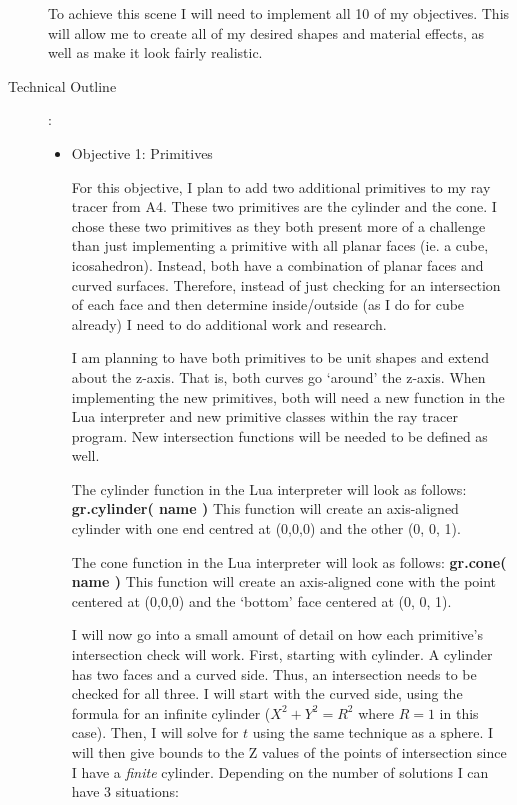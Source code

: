 \documentclass {article}
\begin{document}
\begin{description}
	To achieve this scene I will need to implement all 10 of my objectives. This will allow me to create all of my desired shapes and material effects, as well as make it look fairly realistic. \newline
	
	

\item[Technical Outline]:\\

    \begin{itemize}
    	\item Objective 1: Primitives\newline
    	
    	For this objective, I plan to add two additional primitives to my ray tracer from A4. These two primitives are the cylinder and the cone. I chose these two primitives as they both present more of a challenge than just implementing a primitive with all planar faces (ie. a cube, icosahedron). Instead, both have a combination of planar faces and curved surfaces. Therefore, instead of just checking for an intersection of each face and then determine inside/outside (as I do for cube already) I need to do additional work and research.\newline
		
		I am planning to have both primitives to be unit shapes and extend about the z-axis. That is, both curves go `around' the z-axis. When implementing the new primitives, both will need a new function in the Lua interpreter and new primitive classes within the ray tracer program. New intersection functions will be needed to be defined as well.\newline
		
	The cylinder function in the Lua interpreter will look as follows: {\bf gr.cylinder( name )}\newline
	This function will create an axis-aligned cylinder with one end centred at (0,0,0) and the other (0, 0, 1). \newline
	
	The cone function in the Lua interpreter will look as follows: {\bf gr.cone( name )}\newline
	This function will create an axis-aligned cone with the point centered at (0,0,0) and the `bottom' face centered at (0, 0, 1). \newline


I will now go into a small amount of detail on how each primitive's intersection check will work. First, starting with cylinder. A cylinder has two faces and a curved side. Thus, an intersection needs to be checked for all three. I will start with the curved side, using the formula for an infinite cylinder ($X^2 + Y^2 = R^2$ where $R = 1$ in this case). Then, I will solve for $t$ using the same technique as a sphere. I will then give bounds to the Z values of the points of intersection since I have a {\it finite} cylinder. Depending on the number of solutions I can have 3 situations: \newline


\end{itemize}
\end{description}
\end{document}
